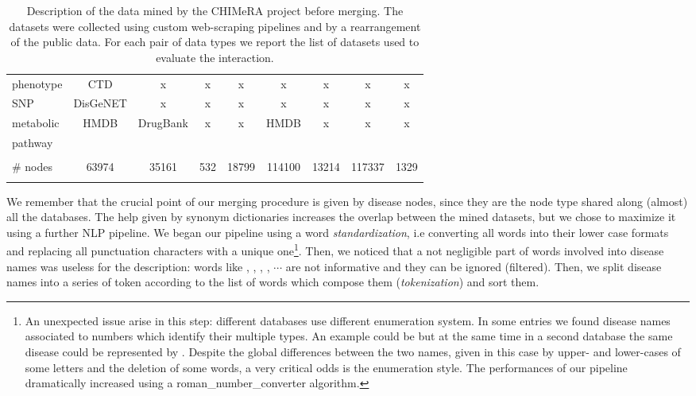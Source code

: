 \documentclass{standalone}
\begin{document}
\begin{table}
\begin{tabular}{lcccccccc}
phenotype               &        CTD          &    x     &    x     &    x     &    x       &    x      &     x    &    x      \\
SNP                     &      DisGeNET       &    x     &    x     &    x     &    x       &    x      &     x    &    x      \\
metabolic               &        HMDB         & DrugBank &    x     &    x     &  HMDB      &    x      &     x    &    x      \\
pathway                 &                     &          &          &          &            &           &          &           \\
\hline\\
\# nodes                &  63974              & 35161    & 532      & 18799    &  114100    & 13214     & 117337   &  1329     \\
\hline\\
\end{tabular}
\caption{Description of the data mined by the \textsf{CHIMeRA} project before merging.
The datasets were collected using custom web-scraping pipelines and by a rearrangement of the public data.
For each pair of data types we report the list of datasets used to evaluate the interaction.
}
\label{tab:chimera_db}
\end{table}

We remember that the crucial point of our merging procedure is given by disease nodes, since they are the node type shared along (almost) all the databases.
The help given by synonym dictionaries increases the overlap between the mined datasets, but we chose to maximize it using a further NLP pipeline.
We began our pipeline using a word \emph{standardization}, i.e converting all words into their lower case formats and replacing all punctuation characters with a unique one\footnote{
  An unexpected issue arise in this step: different databases use different enumeration system.
  In some entries we found disease names associated to numbers which identify their multiple types.
  An example could be  but at the same time in a second database the same disease could be represented by .
  Despite the global differences between the two names, given in this case by upper- and lower-cases of some letters and the deletion of some words, a very critical odds is the enumeration style.
  The performances of our pipeline dramatically increased using a \textsf{roman\_number\_converter} algorithm.
}.
Then, we noticed that a not negligible part of words involved into disease names was useless for the description: words like , , , , $\cdots$ are not informative and they can be ignored (filtered).
Then, we split disease names into a series of token according to the list of words which compose them (\emph{tokenization}) and sort them.
\end{document}
